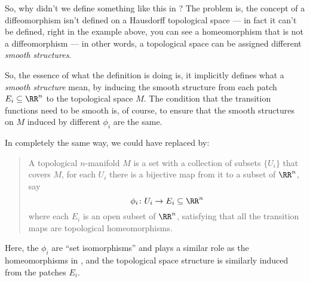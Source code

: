 So, why didn't we define something like this in ?
The problem is, the concept of a diffeomorphism isn't defined on a Hausdorff topological space ---
in fact it can't be defined, right in the example above, you can see a homeomorphism that is not
a diffeomorphism --- in other words, a topological space can be assigned different \emph{smooth
structures}.

So, the essence of what the definition  is doing is, it implicitly defines
what a \emph{smooth structure} mean, by inducing the smooth structure from each patch $E_i \subseteq
\RR^n$ to the topological space $M$.
The condition that the transition functions need to be smooth is, of course, to ensure that the
smooth structures on $M$ induced by different $\phi_i$ are the same.

In completely the same way, we could have replaced  by:
\begin{quote}
	A topological $n$-manifold $M$ is a set with a collection of subsets $\{ U_i \}$ that covers
	$M$, for each $U_i$ there is a bijective map from it to a subset of $\RR^n$, say
	\[ \phi_i \colon U_i \to E_i \subseteq \RR^n \]
	where each $E_i$ is an open subset of $\RR^n$, satisfying that all the transition maps are
	topological homeomorphisms.
\end{quote}

Here, the $\phi_i$ are ``set isomorphisms'' and plays a similar role as the homeomorphisms in
, and the topological space structure is
similarly induced from the patches $E_i$.

